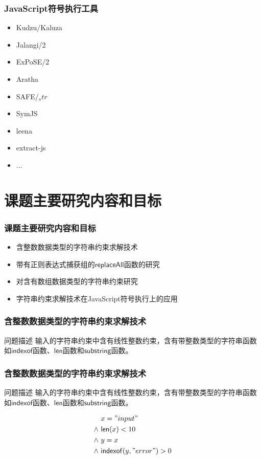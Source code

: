 \documentclass[landscape]{beamer}
\newcommand{\replaceall}{\mathsf{replaceAll}}
\newcommand{\indexof}{\mathsf{indexof}}
\newcommand{\substring}{\mathsf{substring}}
\newcommand{\len}{\mathsf{len}}
\begin{document}
\begin{frame}
  \frametitle{JavaScript符号执行工具}
  \begin{multicols}{2}
    \begin{itemize}
      \item Kudzu/Kaluza
      \item Jalangi/2
      \item ExPoSE/2
      \item Aratha
      \item SAFE/$_str$
      \item SymJS
      \item leena
      \item extract-js
      \item ...
    \end{itemize}
  \end{multicols}
\end{frame}

\section{课题主要研究内容和目标}
\begin{frame}[fragile]
  \frametitle{课题主要研究内容和目标}
  \begin{itemize}
    \item 含整数数据类型的字符串约束求解技术
    \item 带有正则表达式捕获组的$\replaceall$函数的研究
    \item 对含有数组数据类型的字符串约束研究
    \item 字符串约束求解技术在JavaScript符号执行上的应用
  \end{itemize}
\end{frame}
\begin{frame}[fragile, t]
  \frametitle{含整数数据类型的字符串约束求解技术}
  \begin{block}{问题描述}
    输入的字符串约束中含有线性整数约束，含有带整数类型的字符串函数如$\indexof$函数、$\len$函数和$\substring$函数。
  \end{block}
\end{frame}

\begin{frame}[fragile, t]
  \frametitle{含整数数据类型的字符串约束求解技术}
  \begin{block}{问题描述}
    输入的字符串约束中含有线性整数约束，含有带整数类型的字符串函数如$\indexof$函数、$\len$函数和$\substring$函数。
  \end{block}
  \begin{align*}
    & \ x = "input" \\
    \wedge & \ \len(x) < 10\\
    \wedge &\ y = x\\
    \wedge &\ \indexof(y, "error") > 0\\
  \end{align*}
\end{frame}
\end{document}
